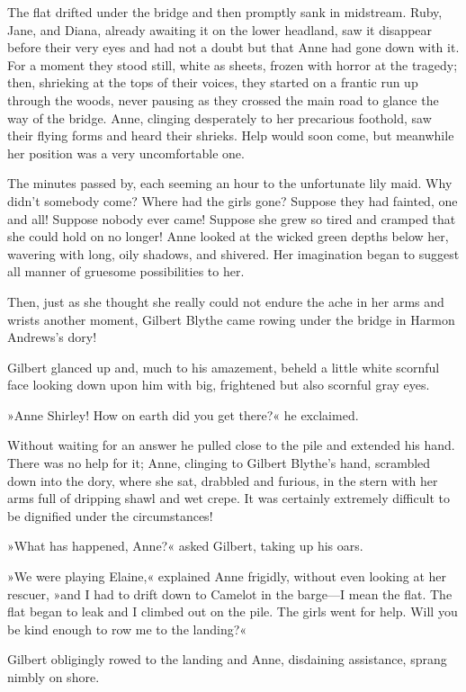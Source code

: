 The flat drifted under the bridge and then promptly sank in midstream. Ruby, Jane, and Diana, already awaiting it on the lower headland, saw it disappear before their very eyes and had not a doubt but that Anne had gone down with it. For a moment they stood still, white as sheets, frozen with horror at the tragedy; then, shrieking at the tops of their voices, they started on a frantic run up through the woods, never pausing as they crossed the main road to glance the way of the bridge. Anne, clinging desperately to her precarious foothold, saw their flying forms and heard their shrieks. Help would soon come, but meanwhile her position was a very uncomfortable one.

The minutes passed by, each seeming an hour to the unfortunate lily maid. Why didn’t somebody come? Where had the girls gone? Suppose they had fainted, one and all! Suppose nobody ever came! Suppose she grew so tired and cramped that she could hold on no longer! Anne looked at the wicked green depths below her, wavering with long, oily shadows, and shivered. Her imagination began to suggest all manner of gruesome possibilities to her.

Then, just as she thought she really could not endure the ache in her arms and wrists another moment, Gilbert Blythe came rowing under the bridge in Harmon Andrews’s dory!

Gilbert glanced up and, much to his amazement, beheld a little white scornful face looking down upon him with big, frightened but also scornful gray eyes.

»Anne Shirley! How on earth did you get there?« he exclaimed.

Without waiting for an answer he pulled close to the pile and extended his hand. There was no help for it; Anne, clinging to Gilbert Blythe’s hand, scrambled down into the dory, where she sat, drabbled and furious, in the stern with her arms full of dripping shawl and wet crepe. It was certainly extremely difficult to be dignified under the circumstances!

»What has happened, Anne?« asked Gilbert, taking up his oars.

»We were playing Elaine,« explained Anne frigidly, without even looking at her rescuer, »and I had to drift down to Camelot in the barge—I mean the flat. The flat began to leak and I climbed out on the pile. The girls went for help. Will you be kind enough to row me to the landing?«

Gilbert obligingly rowed to the landing and Anne, disdaining assistance, sprang nimbly on shore.

